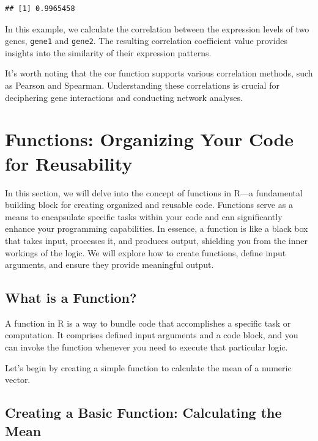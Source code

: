 \documentclass[
]{book}
\begin{document}
\begin{verbatim}
## [1] 0.9965458
\end{verbatim}

In this example, we calculate the correlation between the expression levels of two genes, \texttt{gene1} and \texttt{gene2}. The resulting correlation coefficient value provides insights into the similarity of their expression patterns.

It's worth noting that the cor function supports various correlation methods, such as Pearson and Spearman. Understanding these correlations is crucial for deciphering gene interactions and conducting network analyses.

\hypertarget{functions-organizing-your-code-for-reusability}{%
\section{Functions: Organizing Your Code for Reusability}\label{functions-organizing-your-code-for-reusability}}

In this section, we will delve into the concept of functions in R---a fundamental building block for creating organized and reusable code. Functions serve as a means to encapsulate specific tasks within your code and can significantly enhance your programming capabilities. In essence, a function is like a black box that takes input, processes it, and produces output, shielding you from the inner workings of the logic. We will explore how to create functions, define input arguments, and ensure they provide meaningful output.

\hypertarget{what-is-a-function}{%
\subsection{What is a Function?}\label{what-is-a-function}}

A function in R is a way to bundle code that accomplishes a specific task or computation. It comprises defined input arguments and a code block, and you can invoke the function whenever you need to execute that particular logic.

Let's begin by creating a simple function to calculate the mean of a numeric vector.

\hypertarget{creating-a-basic-function-calculating-the-mean}{%
\subsection{Creating a Basic Function: Calculating the Mean}\label{creating-a-basic-function-calculating-the-mean}}
\end{document}
